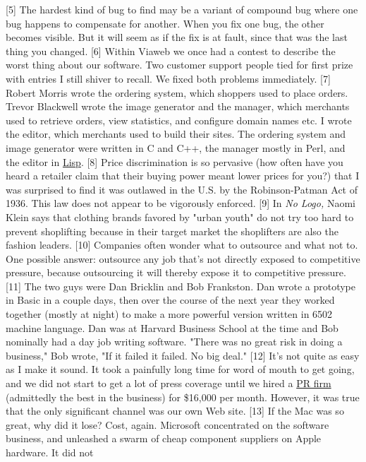 [5] The hardest kind of bug to find may be a variant of compound
bug where one bug happens to compensate for another.  When you fix
one bug, the other becomes visible.  But it will seem as if the
fix is at fault, since that was the last thing you changed.
[6] Within Viaweb we once had a contest to describe the worst thing
about our software.  Two customer support people tied for first
prize with entries I still shiver to recall.  We fixed both problems
immediately.
[7] Robert Morris wrote the ordering system, which shoppers used
to place orders. Trevor Blackwell wrote the image generator and
the manager, which merchants used to retrieve orders, view statistics,
and configure domain names etc.  I wrote the editor, which merchants
used to build their sites.  The ordering system and image generator
were written in C and C++, the manager mostly in Perl, and the editor
in \href{http://www.paulgraham.com/avg.html}{Lisp}.
[8] Price discrimination is so pervasive (how often have you heard
a retailer claim that their buying power meant lower prices for
you?) that I was surprised to find it was outlawed in the U.S. by
the Robinson-Patman Act of 1936.  This law does not appear to be
vigorously enforced.
[9] In \emph{No Logo,} Naomi Klein says that clothing brands favored by
"urban youth" do not try too hard to prevent shoplifting because
in their target market the shoplifters are also the fashion leaders.
[10] Companies often wonder what to outsource and what not to.
One possible answer: outsource any job that's not directly exposed
to competitive pressure, because outsourcing it will thereby expose
it to competitive pressure.
[11] The two guys were Dan Bricklin and Bob Frankston.  Dan wrote
a prototype in Basic in a couple days, then over the course of the
next year they worked together (mostly at night) to make a more
powerful version written in 6502 machine language.  Dan was at
Harvard Business School at the time and Bob nominally had a day
job writing software.  "There was no great risk in doing a business,"
Bob wrote, "If it failed it failed. No big deal."
[12] It's not quite as easy as I make it sound.  It took a painfully
long time for word of mouth to get going, and we did not start to
get a lot of press coverage until we hired a 
\href{http://www.schwartz-pr.com}{PR firm} 
(admittedly
the best in the business) for \$16,000 per month.  However, it was
true that the only significant channel was our own Web site.
[13] If the Mac was so great, why did it lose?  Cost, again.
Microsoft concentrated on the software business, and unleashed a
swarm of cheap component suppliers on Apple hardware.  It did not
